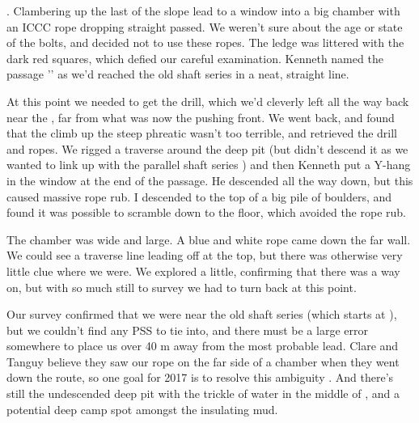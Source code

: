 . Clambering up the last of the slope lead to a window into a big chamber with an ICCC rope dropping straight passed. We weren’t sure about the age or state of the bolts, and decided not to use these ropes. The ledge was littered with the dark red squares, which defied our careful examination. Kenneth named the passage '' as we’d reached the old shaft series in a neat, straight line.
 
At this point we needed to get the drill, which we’d cleverly left all the way back near the , far from what was now the pushing front. We went back, and found that the climb up the steep phreatic wasn’t too terrible, and retrieved the drill and ropes. We rigged a traverse around the deep pit (but didn’t descend it as we wanted to link up with the parallel shaft series ) and then Kenneth put a Y-hang in the window at the end of the passage. He descended all the way down, but this caused massive rope rub. I descended to the top of a big pile of boulders, and found it was possible to scramble down to the floor, which avoided the rope rub.
 
The chamber was wide and large. A blue and white rope came down the far wall. We could see a traverse line leading off at the top, but there was otherwise very little clue where we were. We explored a little, confirming that there was a way on, but with so much still to survey we had to turn back at this point.
 
Our survey confirmed that we were near the old shaft series (which starts at ), but we couldn’t find any PSS to tie into, and there must be a large error somewhere to place us over 40 m away from the most probable lead. Clare and Tanguy believe they saw our rope on the far side of a chamber when they went down the  route, so one goal for 2017 is to resolve this ambiguity . And there’s still the undescended deep pit with the trickle of water in the middle of , and a potential deep camp spot amongst the insulating mud.
 
